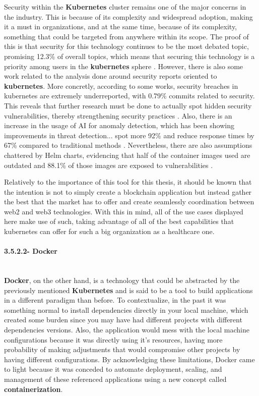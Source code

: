 Security within the \textbf{Kubernetes} cluster remains one of the major concerns in the industry. This is because of its complexity and widespread adoption, making it a must in organizations, and at the same time, because of its complexity, something that could be targeted from anywhere within its scope. The proof of this is that security for this technology continues to be the most debated topic, promising 12.3\% of overall topics, which means that securing this technology is a priority among users in the \textbf{kubernetes} sphere \cite{kubernetes-security-concerns-yet}. However, there is also some work related to the analysis done around security reports oriented to \textbf{kubernetes}. More concretly, according to some works, security breaches in kubernetes are extremely underreported, with 0.79\% commits related to security. This reveals that further research must be done to actually spot hidden security vulnerabilities, thereby strengthening security practices \cite{under-reported-kubernetes}. Also, there is an increase in the usage of AI for anomaly detection, which has been showing improvements in threat detection... spot more 92\% and reduce response times by 67\% compared to traditional methods \cite{ai-k8-spot}. Nevertheless, there are also assumptions chattered by Helm charts, evidencing that half of the container images used are outdated and 88.1\% of those images are exposed to vulnerabilities \cite{helm-images-vulnerabilities}.

Relatively to the importance of this tool for this thesis, it should be known that the intention is not to simply create a blockchain application but instead gather the best that the market has to offer and create seamlessly coordination between web2 and web3 technologies. With this in mind, all of the use cases displayed here make use of such, taking advantage of all of the best capabilities that kubernetes can offer for such a big organization as a healthcare one.

\paragraph{3.5.2.2- Docker}\mbox{}\\
\textbf{Docker}, on the other hand, is a  technology that could be abstracted by the previously mentioned \textbf{Kubernetes} and is said to be a tool to build applications in a different paradigm than before. To contextualize, in the past it was something normal to install dependencies directly in your local machine, which created some burden since you may have had different projects with different dependencies versions. Also, the application would mess with the local machine configurations because it was directly using it's resources, having more probability of making adjustments that would compromise other projects by having different configurations. By acknowledging these limitations, Docker came to light because it was conceded to automate deployment, scaling, and management of these referenced applications using a new concept called \textbf{containerization}. 


